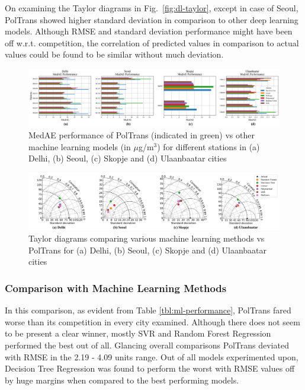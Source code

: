 \documentclass[twocolumn]{svjour3}          %
\begin{document}
On examining the Taylor diagrams in Fig.~\ref{fig:dl-taylor}, except in case of Seoul, {PolTrans} showed higher standard deviation in comparison to other deep learning models. Although RMSE and standard deviation performance might have been off w.r.t. competition, the correlation of predicted values in comparison to actual values could be found to be similar without much deviation.

\begin{figure}[h]
\centering
\includegraphics[scale=0.365]{./ml_medae.png}
\caption{MedAE performance of {PolTrans} (indicated in green) vs other machine learning models (in $\mu$g/m$^{3}$) for different stations in (a) Delhi, (b) Seoul, (c) Skopje and (d) Ulaanbaatar cities}
\label{fig:ml-medae}
\end{figure}

\begin{figure}[h]
\centering
\includegraphics[width=18cm]{./merged_taylor_ml.png}
\caption{Taylor diagrams comparing various machine learning methods vs {PolTrans} for (a) Delhi, (b) Seoul, (c) Skopje and (d) Ulaanbaatar cities}
\label{fig:ml-taylor}
\end{figure}

\subsubsection{Comparison with Machine Learning Methods}
\label{sec:ml-comp}

In this comparison, as evident from Table \ref{tbl:ml-performance}, {PolTrans} fared worse than its competition in every city examined. Although there does not seem to be present a clear winner, mostly SVR and Random Forest Regression performed the best out of all. Glancing overall comparisons {PolTrans} deviated with RMSE in the 2.19 - 4.09 units range. Out of all models experimented upon, Decision Tree Regression was found to perform the worst with RMSE values off by huge margins when compared to the best performing models.
\end{document}
